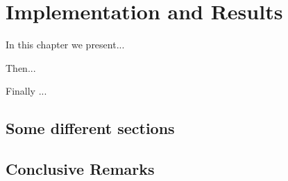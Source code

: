 \chapter{Implementation and Results}
\label{chap:Implementation}
\thispagestyle{plain}
\vspace{0.5cm}

\noindent In this chapter we present...

Then...

Finally ...


\section{Some different sections}

\section{Conclusive Remarks}
